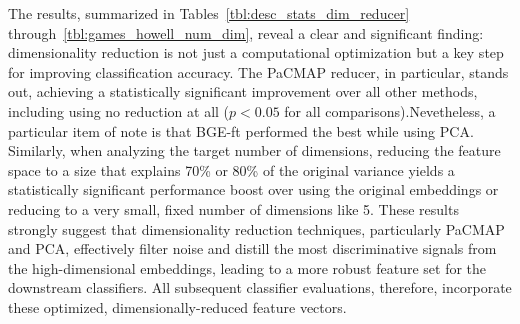 The results, summarized in Tables~\ref{tbl:desc_stats_dim_reducer} through~\ref{tbl:games_howell_num_dim}, reveal a clear and significant finding: dimensionality reduction is not just a computational optimization but a key step for improving classification accuracy. The PaCMAP reducer, in particular, stands out, achieving a statistically significant improvement over all other methods, including using no reduction at all (\(p<0.05\) for all comparisons).Nevetheless, a particular item of note is that BGE-ft performed the best while using PCA.  Similarly, when analyzing the target number of dimensions, reducing the feature space to a size that explains 70\% or 80\% of the original variance yields a statistically significant performance boost over using the original embeddings or reducing to a very small, fixed number of dimensions like 5. These results strongly suggest that dimensionality reduction techniques, particularly PaCMAP and PCA, effectively filter noise and distill the most discriminative signals from the high-dimensional embeddings, leading to a more robust feature set for the downstream classifiers. All subsequent classifier evaluations, therefore, incorporate these optimized, dimensionally-reduced feature vectors.

\begin{table}[h!]
    \captionsetup{skip=5pt}
\centering
\caption{Descriptive Statistics for F1-Scores by Dimensionality Reducer (Test Data)}
\label{tbl:desc_stats_dim_reducer}
\end{table}


